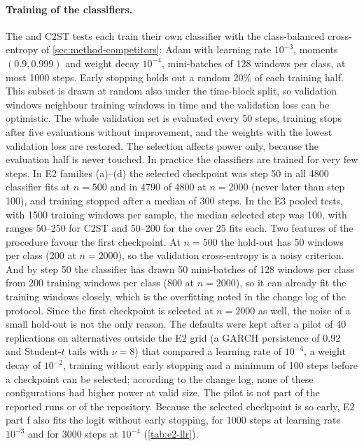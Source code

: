 \paragraph{Training of the classifiers.}
The \LRC{} and C2ST tests each train their own classifier with the class-balanced cross-entropy
of \cref{sec:method-competitors}: Adam with learning rate $10^{-3}$, moments $(0.9,0.999)$ and
weight decay $10^{-4}$, mini-batches of 128 windows per class, at most 1000 steps. Early
stopping holds out a random 20\% of each training half. This subset is drawn at random also
under the time-block split, so validation windows neighbour training windows in time and the
validation loss can be optimistic. The whole validation set is evaluated every 50 steps,
training stops after five evaluations without improvement, and the weights with the lowest
validation loss are restored. The selection affects power only, because the evaluation half is
never touched. In practice the classifiers are trained for very few steps. In E2 families
(a)--(d) the selected checkpoint was step 50 in all 4800 classifier fits at $n=500$ and in 4790
of 4800 at $n=2000$ (never later than step 100), and training stopped after a median of 300
steps. In the E3 pooled tests, with 1500 training windows per sample, the median selected step
was 100, with ranges 50--250 for C2ST and 50--200 for the \LRC{} over 25 fits each. Two features
of the procedure favour the first checkpoint. At $n=500$ the hold-out has 50 windows per class
(200 at $n=2000$), so the validation cross-entropy is a noisy criterion. And by step 50 the
classifier has drawn 50 mini-batches of 128 windows per class from 200 training windows per
class (800 at $n=2000$), so it can already fit the training windows closely, which is the
overfitting noted in the change log of the protocol. Since the first checkpoint is selected at
$n=2000$ as well, the noise of a small hold-out is not the only reason. The defaults were kept
after a pilot of 40 replications on alternatives outside the E2 grid (a GARCH persistence of
0.92 and Student-$t$ tails with $\nu=8$) that compared a learning rate of $10^{-4}$, a weight
decay of $10^{-2}$, training without early stopping and a minimum of 100 steps before a
checkpoint can be selected; according to the change log, none of these configurations had
higher power at valid size. The pilot is not part of the reported runs or of the repository.
Because the selected checkpoint is so early, E2 part f also fits the logit without early
stopping, for 1000 steps at learning rate $10^{-3}$ and for 3000 steps at $10^{-4}$
(\cref{tab:e2-llr}).

